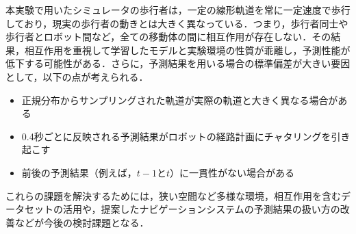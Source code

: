 本実験で用いたシミュレータの歩行者は，一定の線形軌道を常に一定速度で歩行しており，現実の歩行者の動きとは大きく異なっている．つまり，歩行者同士や歩行者とロボット間など，全ての移動体の間に相互作用が存在しない．その結果，相互作用を重視して学習したモデルと実験環境の性質が乖離し，予測性能が低下する可能性がある．さらに，予測結果を用いる場合の標準偏差が大きい要因として，以下の点が考えられる．
\begin{itemize}
  \item 正規分布からサンプリングされた軌道が実際の軌道と大きく異なる場合がある
  \item 0.4秒ごとに反映される予測結果がロボットの経路計画にチャタリングを引き起こす
  \item 前後の予測結果（例えば，$t-1\text{と}t$）に一貫性がない場合がある
\end{itemize}
これらの課題を解決するためには，狭い空間など多様な環境，相互作用を含むデータセットの活用や，提案したナビゲーションシステムの予測結果の扱い方の改善などが今後の検討課題となる．

\newpage

